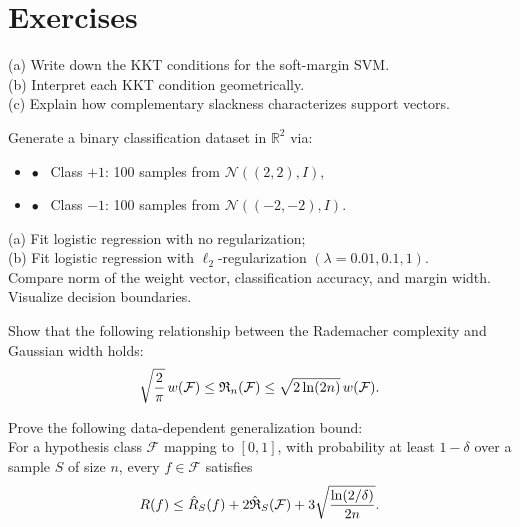\section*{Exercises}

\begin{myexercise}\hfill

\noindent
(a) Write down the KKT conditions for the soft-margin SVM.\\
(b) Interpret each KKT condition geometrically. \\
(c) Explain how complementary slackness characterizes support vectors.
\end{myexercise}


\begin{myexercise}
Generate a binary classification dataset in $\mathbb{R}^2$ via: 
\begin{itemize}
\item[] \quad $\bullet$ \, Class $+1$: 100 samples from $\mathcal N((2,2), I)$,
\item[] \quad $\bullet$ \, Class $-1$: 100 samples from $\mathcal N((-2,-2), I)$.
\end{itemize}
(a) Fit logistic regression with no regularization;\\
(b) Fit logistic regression with $\ell_2$-regularization $(\lambda = 0.01, 0.1, 1)$.
\\
Compare norm of the weight vector, classification accuracy, and margin width. Visualize decision boundaries.
    
\end{myexercise}

\begin{myexercise}\label{ex:rademacher}
Show that the following relationship between the Rademacher complexity and Gaussian width holds:
$$\sqrt{\frac{2}{\pi}}\,w(\mathcal{F}) \leq  \mathfrak{R}_n(\mathcal{F})\leq \sqrt{2 \ln(2n)} \,w(\mathcal{F}).$$
\end{myexercise}

\begin{myexercise}\label{ex:rademacher2}
Prove the following data-dependent generalization bound: \\
For a hypothesis class $\mathcal{F}$ mapping to $[0, 1]$, with probability at least $1 - \delta$ over a sample $S$ of size $n$, every $f \in \mathcal{F}$ satisfies
$$R(f) \leq \hat{R}_S(f) + 2\hat{\mathfrak{R}}_S(\mathcal{F}) + 3\sqrt{\frac{\ln(2/\delta)}{2n}}.$$
\end{myexercise}

